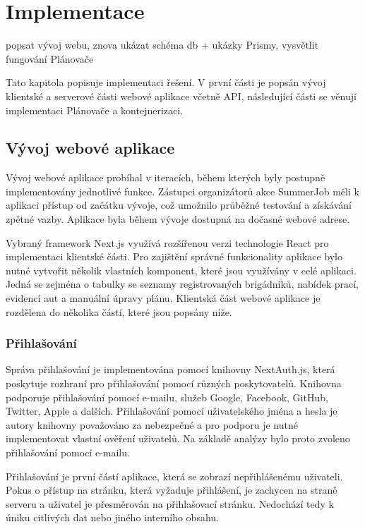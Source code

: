 \chapter{Implementace}

popsat vývoj webu, znova ukázat schéma db + ukázky Prismy, vysvětlit fungování Plánovače

Tato kapitola popisuje implementaci řešení. V první části je popsán vývoj klientské a serverové části webové aplikace včetně API, následující části se 
věnují implementaci Plánovače a kontejnerizaci.

\section{Vývoj webové aplikace}

Vývoj webové aplikace probíhal v iteracích, během kterých byly postupně implementovány jednotlivé funkce. Zástupci organizátorů akce SummerJob
měli k aplikaci přístup od začátku vývoje, což umožnilo průběžné testování a získávání zpětné vazby. Aplikace byla během vývoje dostupná na dočasné webové adrese.

Vybraný framework Next.js využívá rozšířenou verzi technologie React pro implementaci klientské části.
Pro zajištění správné funkcionality aplikace bylo nutné vytvořit několik vlastních komponent,
které jsou využívány v celé aplikaci. Jedná se zejména o tabulky se seznamy registrovaných brigádníků,
nabídek prací, evidencí aut a manuální úpravy plánu.
Klientská část webové aplikace je rozdělena do několika částí, které jsou popsány níže.

\subsection{Přihlašování}

Správa přihlašování je implementována pomocí knihovny NextAuth.js, která poskytuje rozhraní pro přihlašování pomocí různých poskytovatelů. Knihovna podporuje
přihlašování pomocí e-mailu, služeb Google, Facebook, GitHub, Twitter, Apple a dalších. Přihlašování pomocí uživatelského jména a hesla je autory knihovny 
považováno za nebezpečné a pro podporu je nutné implementovat vlastní ověření uživatelů. Na základě analýzy bylo proto zvoleno přihlašování pomocí e-mailu.

Přihlašování je první částí aplikace, která se zobrazí nepřihlášenému uživateli. Pokus o přístup na stránku, která vyžaduje přihlášení,
je zachycen na straně serveru a uživatel je přesměrován na přihlašovací stránku. Nedochází tedy k úniku citlivých dat nebo jiného interního obsahu.

